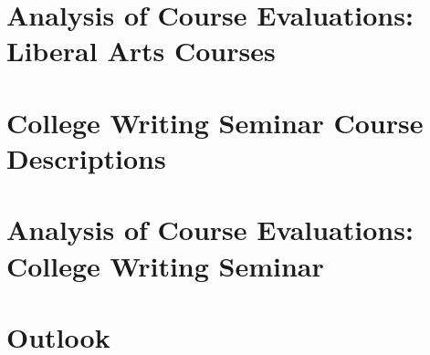 \documentclass[../../main.tex]{subfiles}
\begin{document}
\section{Analysis of Course Evaluations: Liberal Arts Courses}

%

\begin{flushleft}

\end{flushleft}

\section{College Writing Seminar Course Descriptions}

%

\begin{flushleft}

\end{flushleft}

\section{Analysis of Course Evaluations: College Writing Seminar}

%

\begin{flushleft}

\end{flushleft}

\section{Outlook}

%

\begin{flushleft}

\end{flushleft}
\end{document}

